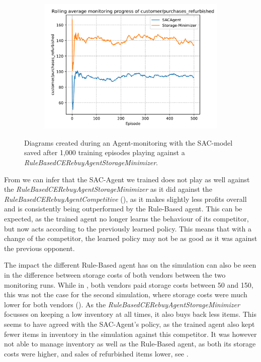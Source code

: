 \begin{figure}[ht]
\begin{subfigure}{0.33\textwidth}
		\centering
		\includegraphics[width = \textwidth]{images/experiments/SACDuopolyOtherComp/SACOtherCompPurchasesRefurbished.pdf}\\
		\label{fig:SACDuopolyOtherCompetitors3}
	\end{subfigure}
	\caption{Diagrams created during an Agent-monitoring with the SAC-model saved after 1,000 training episodes playing against a \emph{RuleBasedCERebuyAgentStorageMinimizer}.}\label{fig:SACDuopolyOtherCompetitors}
\end{figure}

From  we can infer that the SAC-Agent we trained does not play as well against the \emph{RuleBasedCERebuyAgentStorageMinimizer} as it did against the \emph{RuleBasedCERebuyAgentCompetitive} (), as it makes slightly less profits overall and is consistently being outperformed by the Rule-Based agent. This can be expected, as the trained agent no longer learns the behaviour of its competitor, but now acts according to the previously learned policy. This means that with a change of the competitor, the learned policy may not be as good as it was against the previous opponent.

The impact the different Rule-Based agent has on the simulation can also be seen in the difference between storage costs of both vendors between the two monitoring runs. While in , both vendors paid storage costs between 50 and 150, this was not the case for the second simulation, where storage costs were much lower for both vendors (). As the \emph{RuleBasedCERebuyAgentStorageMinimizer} focusses on keeping a low inventory at all times, it also buys back less items. This seems to have agreed with the SAC-Agent's policy, as the trained agent also kept fewer items in inventory in the simulation against this competitor. It was however not able to manage inventory as well as the Rule-Based agent, as both its storage costs were higher, and sales of refurbished items lower, see .

